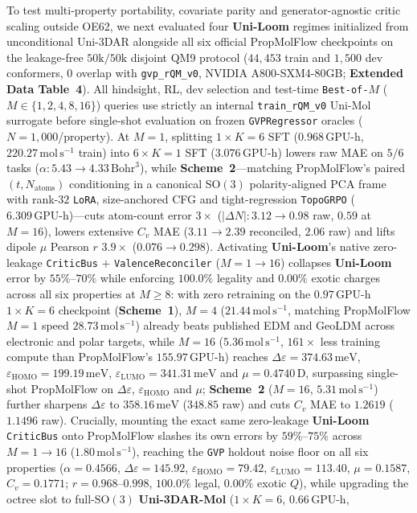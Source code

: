 \documentclass[11pt,a4paper]{article}
\begin{document}
To test multi-property portability, covariate parity and generator-agnostic critic scaling outside OE62, we next evaluated four \textbf{Uni-Loom} regimes initialized from unconditional Uni-3DAR\cite{lu2025uni3dar} alongside all six official PropMolFlow\cite{zeng2026propmolflow} checkpoints on the leakage-free $50\text{k}/50\text{k}$ disjoint QM9 protocol\cite{ramakrishnan2014qm9,zeng2026propmolflow} ($44{,}453$ train and $1{,}500$ dev conformers, $0$ overlap with \texttt{gvp\_rQM\_v0}, NVIDIA A800-SXM4-80GB; \textbf{Extended Data Table~4}). All hindsight, RL, dev selection and test-time \texttt{Best-of-$M$} ($M\in\{1,2,4,8,16\}$) queries use strictly an internal \texttt{train\_rQM\_v0} Uni-Mol surrogate\cite{zhou2023unimol} before single-shot evaluation on frozen \texttt{GVPRegressor} oracles ($N=1{,}000$/property). At $M=1$, splitting $1\times K=6$ SFT ($0.968\,\text{GPU-h}$, $220.27\,\text{mol}\,\text{s}^{-1}$ train) into $6\times K=1$ SFT ($3.076\,\text{GPU-h}$) lowers raw MAE on $5/6$ tasks ($\alpha: 5.43 \to 4.33\,\text{Bohr}^3$), while \textbf{Scheme~2}---matching PropMolFlow's paired $(t,N_{\text{atoms}})$ conditioning in a canonical $\text{SO}(3)$ polarity-aligned PCA frame with rank-$32$ \texttt{LoRA}, size-anchored CFG and tight-regression \texttt{TopoGRPO} ($6.309\,\text{GPU-h}$)---cuts atom-count error $3\times$ ($|\Delta N|: 3.12 \to 0.98$ raw, $0.59$ at $M=16$), lowers extensive $C_v$ MAE ($3.11 \to 2.39$ reconciled, $2.06$ raw) and lifts dipole $\mu$ Pearson $r$ $3.9\times$ ($0.076 \to 0.298$). Activating \textbf{Uni-Loom}'s native zero-leakage \texttt{CriticBus} $+$ \texttt{ValenceReconciler} ($M=1\to 16$) collapses \textbf{Uni-Loom} error by $55\%\text{--}70\%$ while enforcing $100.0\%$ legality and $0.00\%$ exotic charges across all six properties at $M\ge 8$: with zero retraining on the $0.97\,\text{GPU-h}$ $1\times K=6$ checkpoint (\textbf{Scheme~1}), $M=4$ ($21.44\,\text{mol}\,\text{s}^{-1}$, matching PropMolFlow $M=1$ speed $28.73\,\text{mol}\,\text{s}^{-1}$) already beats published EDM\cite{hoogeboom2022edm} and GeoLDM\cite{xu2023geoldm} across electronic and polar targets, while $M=16$ ($5.36\,\text{mol}\,\text{s}^{-1}$, $161\times$ less training compute than PropMolFlow's $155.97\,\text{GPU-h}$) reaches $\Delta\varepsilon=374.63\,\text{meV}$, $\varepsilon_{\text{HOMO}}=199.19\,\text{meV}$, $\varepsilon_{\text{LUMO}}=341.31\,\text{meV}$ and $\mu=0.4740\,\text{D}$, surpassing single-shot PropMolFlow on $\Delta\varepsilon$, $\varepsilon_{\text{HOMO}}$ and $\mu$; \textbf{Scheme~2} ($M=16$, $5.31\,\text{mol}\,\text{s}^{-1}$) further sharpens $\Delta\varepsilon$ to $358.16\,\text{meV}$ ($348.85$ raw) and cuts $C_v$ MAE to $1.2619$ ($1.1496$ raw). Crucially, mounting the exact same zero-leakage \textbf{Uni-Loom} \texttt{CriticBus} onto PropMolFlow slashes its own errors by $59\%\text{--}75\%$ across $M=1\to 16$ ($1.80\,\text{mol}\,\text{s}^{-1}$), reaching the \texttt{GVP} holdout noise floor on all six properties ($\alpha=0.4566$, $\Delta\varepsilon=145.92$, $\varepsilon_{\text{HOMO}}=79.42$, $\varepsilon_{\text{LUMO}}=113.40$, $\mu=0.1587$, $C_v=0.1771$; $r=0.968\text{--}0.998$, $100.0\%$ legal, $0.00\%$ exotic $Q$), while upgrading the octree slot to full-$\text{SO}(3)$ \textbf{Uni-3DAR-Mol}\cite{chen2026uni3darmol} ($1\times K=6$, $0.66\,\text{GPU-h}$, 
\end{document}
